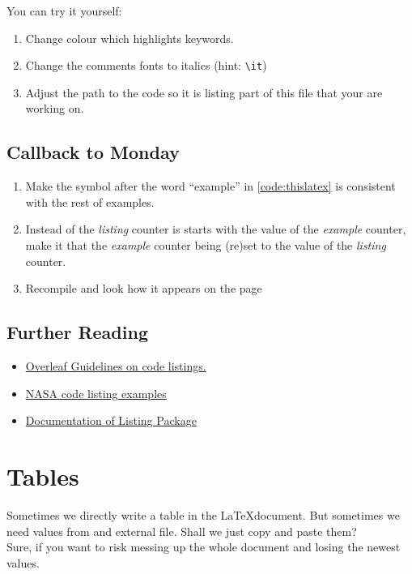 \documentclass[a4paper,10pt]{report} %
\begin{document}
\noindent You can try it yourself:
\begin{enumerate}
 \item Change colour which highlights keywords. 
 \item Change the comments fonts to italics (hint: \texttt{\textbackslash it})
 \item Adjust the path to the code so it is listing part of this file that your are working on.
\end{enumerate}

\subsection{Callback to Monday}
\begin{enumerate} 
 \item Make the symbol after the word ``example'' in \ref{code:thislatex} is consistent with the rest of examples. 
 \item Instead of the \emph{listing} counter is starts with the value of the \emph{example} counter, make it that the \emph{example} counter being (re)set to the value of the \emph{listing} counter.
 \item Recompile and look how it appears on the page \pageref{listings}
\end{enumerate}

\subsection*{Further Reading}
\begin{itemize}
 \item \href{https://www.overleaf.com/learn/latex/Code_listing}{Overleaf Guidelines on code listings.}
 \item \href{https://nasa.github.io/nasa-latex-docs/html/examples/listing.html}{NASA code listing examples}
 \item \href{https://texdoc.org/serve/listings.pdf/0}{Documentation of Listing Package}
\end{itemize}


\newpage 

\section{Tables}

Sometimes we directly write a table  in the \LaTeX document. But sometimes we need values from and external file. Shall we just copy and paste them?~\vspace{2ex}\\
Sure, if you want to risk messing up the whole document and losing the newest values.~\vspace{2ex}
\end{document}
